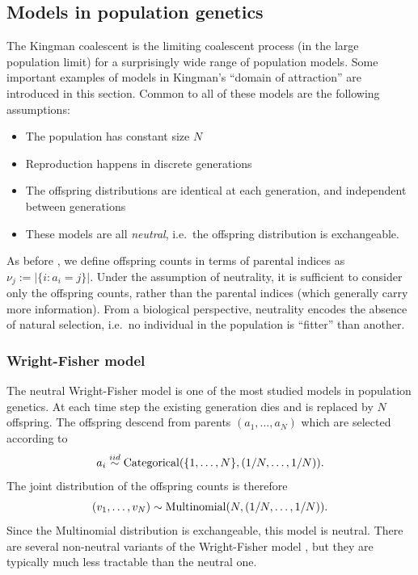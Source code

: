 \subsection{Models in population genetics}\label{sec:popgenmodels}
The Kingman coalescent is the limiting coalescent process (in the large population limit) for a surprisingly wide range of population models. Some important examples of models in Kingman's ``domain of attraction'' are introduced in this section.
Common to all of these models are the following assumptions:
\begin{itemize}
\item The population has constant size $N$
\item Reproduction happens in discrete generations
\item The offspring distributions are identical at each generation, and independent between generations
\item These models are all \emph{neutral}, i.e.\ the offspring distribution is exchangeable.
\end{itemize}
As before , we define offspring counts in terms of parental indices as $\nu_j := |\{ i: a_i = j\}|$.
Under the assumption of neutrality, it is sufficient to consider only the offspring counts, rather than the parental indices (which generally carry more information).
From a biological perspective, neutrality encodes the absence of natural selection, i.e.\ no individual in the population is ``fitter'' than another.

\subsubsection{Wright-Fisher model}
The neutral Wright-Fisher model \parencite{fisher1923, fisher1930, wright1931} is one of the most studied models in population genetics.
At each time step the existing generation dies and is replaced by $N$ offspring. The offspring descend from parents $(a_1, \dots, a_N)$ which are selected according to
\begin{equation*}
a_i \overset{iid}{\sim} \operatorname{Categorical}(\{1, \dots, N\}, (1/N, \dots, 1/N)).
\end{equation*}
The joint distribution of the offspring counts is therefore
\begin{equation*}
(v_1,\dots, v_N) \sim \operatorname{Multinomial}(N, (1/N, \dots, 1/N)).
\end{equation*}
Since the Multinomial distribution is exchangeable, this model is neutral.
There are several non-neutral variants of the Wright-Fisher model , but they are typically much less tractable than the neutral one.

